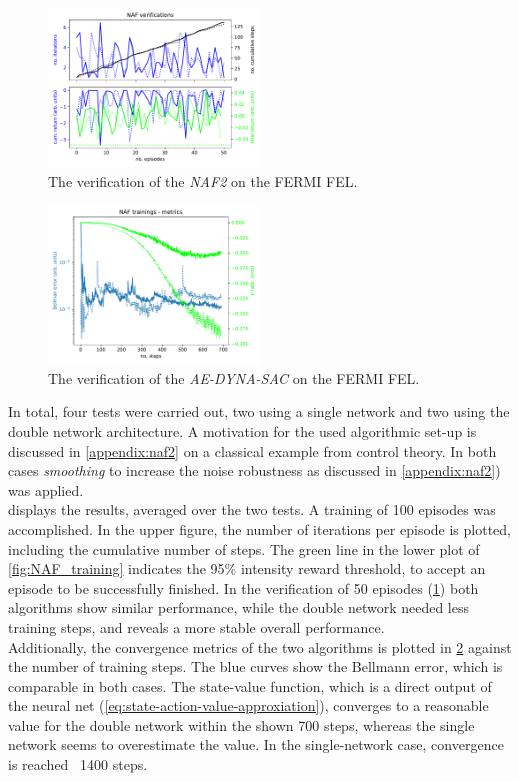 \documentclass[
reprint,
amsmath,amssymb,amsfonts,clevref,
aps,
prstab,
]{revtex4-2}
\begin{document}
	\begin{figure}
		\centering
		\includegraphics*[width=0.5\textwidth]{Figures/FERMI_all_experiments_NAF_verification_episodes.pdf}
		\caption{The verification of the \emph{NAF2} on the FERMI FEL.}
		\label{fig:NAF_verification}
	\end{figure}
	
	\begin{figure}
		\centering
		\includegraphics*[width=0.5\textwidth]{Figures/FERMI_all_experiments_NAF_convergence.pdf}
		\caption{The verification of the \emph{AE-DYNA-SAC} on the FERMI FEL.}
		\label{fig:NAF_convergence}
	\end{figure}
	In total, four tests were carried out, two using a single network and two using the double network architecture. A motivation for the used algorithmic set-up is discussed in \cref{appendix:naf2} on a classical example from control theory. In both cases \emph{smoothing} to increase the noise robustness as discussed in \cref{appendix:naf2}) was applied.\\
	 displays the results, averaged over the two tests. A training of 100 episodes was accomplished. In the upper figure, the number of iterations per episode is plotted, including the cumulative number of steps. The green line in the lower plot of \cref{fig:NAF_training} indicates the 95\% intensity reward threshold, to accept an episode to be successfully finished.
	In the verification of 50 episodes (\cref{fig:NAF_verification}) both algorithms show similar performance, while the double network needed less training steps, and reveals a more stable overall performance. \\
	Additionally, the convergence metrics of the two algorithms is plotted in \cref{fig:NAF_convergence} against the number of training steps. The blue curves show the Bellmann error, which is comparable in both cases. The state-value function, which is a direct output of the neural net (\cref{eq:state-action-value-approxiation}), converges to a reasonable value for the double network within the shown 700 steps, whereas the single network seems to overestimate the value. In the single-network case, convergence is reached ~1400 steps.
\end{document}
